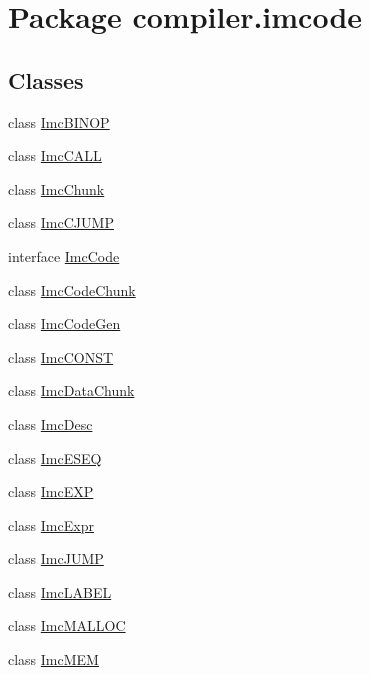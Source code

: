 \hypertarget{namespacecompiler_1_1imcode}{}\section{Package compiler.\+imcode}
\label{namespacecompiler_1_1imcode}
\subsection*{Classes}
\begin{DoxyCompactItemize}
\item 
class \hyperlink{classcompiler_1_1imcode_1_1_imc_b_i_n_o_p}{Imc\+B\+I\+N\+OP}
\item 
class \hyperlink{classcompiler_1_1imcode_1_1_imc_c_a_l_l}{Imc\+C\+A\+LL}
\item 
class \hyperlink{classcompiler_1_1imcode_1_1_imc_chunk}{Imc\+Chunk}
\item 
class \hyperlink{classcompiler_1_1imcode_1_1_imc_c_j_u_m_p}{Imc\+C\+J\+U\+MP}
\item 
interface \hyperlink{interfacecompiler_1_1imcode_1_1_imc_code}{Imc\+Code}
\item 
class \hyperlink{classcompiler_1_1imcode_1_1_imc_code_chunk}{Imc\+Code\+Chunk}
\item 
class \hyperlink{classcompiler_1_1imcode_1_1_imc_code_gen}{Imc\+Code\+Gen}
\item 
class \hyperlink{classcompiler_1_1imcode_1_1_imc_c_o_n_s_t}{Imc\+C\+O\+N\+ST}
\item 
class \hyperlink{classcompiler_1_1imcode_1_1_imc_data_chunk}{Imc\+Data\+Chunk}
\item 
class \hyperlink{classcompiler_1_1imcode_1_1_imc_desc}{Imc\+Desc}
\item 
class \hyperlink{classcompiler_1_1imcode_1_1_imc_e_s_e_q}{Imc\+E\+S\+EQ}
\item 
class \hyperlink{classcompiler_1_1imcode_1_1_imc_e_x_p}{Imc\+E\+XP}
\item 
class \hyperlink{classcompiler_1_1imcode_1_1_imc_expr}{Imc\+Expr}
\item 
class \hyperlink{classcompiler_1_1imcode_1_1_imc_j_u_m_p}{Imc\+J\+U\+MP}
\item 
class \hyperlink{classcompiler_1_1imcode_1_1_imc_l_a_b_e_l}{Imc\+L\+A\+B\+EL}
\item 
class \hyperlink{classcompiler_1_1imcode_1_1_imc_m_a_l_l_o_c}{Imc\+M\+A\+L\+L\+OC}
\item 
class \hyperlink{classcompiler_1_1imcode_1_1_imc_m_e_m}{Imc\+M\+EM}

\end{DoxyCompactItemize}
